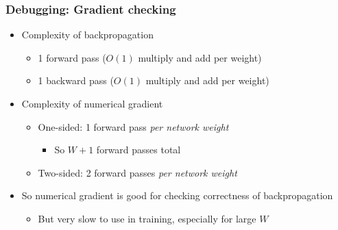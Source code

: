 \documentclass[12pt,notes,mathserif]{beamer}
\begin{document}
\begin{frame}[c]
	\frametitle{Debugging: Gradient checking}
	\begin{itemize}
		\item  Complexity of backpropagation
		      \begin{itemize}
			      \item 1 forward pass ($O(1)$ multiply and add per weight)
			      \item 1 backward pass ($O(1)$ multiply and add per weight)
		      \end{itemize}
		\item  Complexity of numerical gradient
		      \begin{itemize}
			      \item One-sided: 1 forward pass \textit{per network weight}
			            \begin{itemize}
				            \item  So $W + 1$ forward passes total
			            \end{itemize}
			      \item Two-sided: 2 forward passes \textit{per network weight}

		      \end{itemize}
		\item  So numerical gradient is good for checking correctness of backpropagation

		      \begin{itemize}
			      \item But very slow to use in training, especially for large $W$
		      \end{itemize}
	\end{itemize}
\end{frame}
\end{document}
